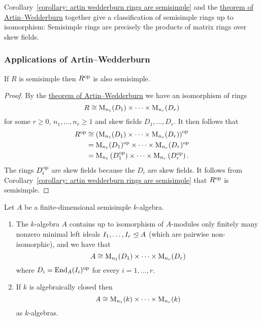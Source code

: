 \begin{remark}
  Corollary~\ref{corollary: artin wedderburn rings are semisimple} and the \hyperref[theorem: artin wedderburn theorem]{theorem of Artin--Wedderburn} together give a classification of semisimple rings up to isomorphism:
  Semisimple rings are precisely the products of matrix rings over skew fields.
\end{remark}







\subsubsection{Applications of Artin--Wedderburn}


\begin{corollary}
  If $R$ is semisimple then $R^{\mathrm{op}}$ is also semisimple.
\end{corollary}


\begin{proof}
  By the \hyperref[theorem: artin wedderburn theorem]{theorem of Artin--Wedderburn} we have an isomorphism of rings
  \[
          R
    \cong \operatorname{M}_{n_1}(D_1) \times \dotsm \times \operatorname{M}_{n_r}(D_r)
  \]
  for some $r \geq 0$, $n_1, \dotsc, n_r \geq 1$ and skew fields $D_1, \dotsc, D_r$.
  It then follows that
  \begin{align*}
            R^{\mathrm{op}}
    &\cong  \left( \operatorname{M}_{n_1}(D_1) \times \dotsm \times \operatorname{M}_{n_r}(D_r) \right)^{\mathrm{op}} \\
    &=      \operatorname{M}_{n_1}(D_1)^{\mathrm{op}} \times \dotsm \times \operatorname{M}_{n_r}(D_r)^{\mathrm{op}} \\
    &=      \operatorname{M}_{n_1}\left( D_1^{\mathrm{op}} \right) \times \dotsm \times \operatorname{M}_{n_r}\left( D_r^{\mathrm{op}} \right).
  \end{align*}
  The rings $D_i^{\mathrm{op}}$ are skew fields because the $D_i$ are skew fields.
  It follows from Corollary~\ref{corollary: artin wedderburn rings are semisimple} that $R^{\mathrm{op}}$ is semisimple.
\end{proof}


\begin{corollary}
  \label{corollary: semisimple algebra product of matrix algebras}
  Let $A$ be a finite-dimensional semisimple $k$-algebra.
  \begin{enumerate}
    \item
      The $k$-algebra $A$ contains up to isomorphism of $A$-modules only finitely many nonzero minimal left ideals $I_1, \dotsc, I_r \trianglelefteq A$ (which are pairwise non-isomorphic), and we have that
      \[
              A
        \cong \operatorname{M}_{n_1}(D_1) \times \dotsm \times \operatorname{M}_{n_r}(D_r)
      \]
      where $D_i = \operatorname{End}_A(I_i)^{\mathrm{op}}$ for every $i = 1, \dotsc, r$.
      
    \item
      If $k$ is algebraically closed then
      \[
              A
        \cong \operatorname{M}_{n_1}(k) \times \dotsm \times \operatorname{M}_{n_r}(k)
      \]
      as $k$-algebras.
  \end{enumerate}
\end{corollary}


